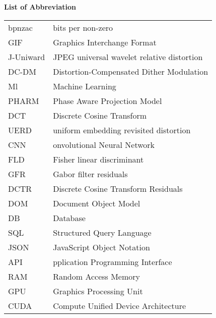 
\begin{flushleft}
     \Huge{\textbf{List of Abbreviation}}\vspace{1cm}\\
\end{flushleft}
\normalsize{\begin{tabular}{l l}
    bpnzac&bits per non-zero\\
    GIF&Graphics Interchange Format\\
    J-Uniward&JPEG universal wavelet relative distortion\\
    DC-DM&Distortion-Compensated Dither Modulation\\
Ml&Machine Learning\\
PHARM&Phase Aware Projection Model\\
DCT&Discrete Cosine Transform\\
UERD&uniform embedding revisited distortion\\ 
CNN&onvolutional Neural Network\\
FLD&Fisher linear discriminant\\
GFR&Gabor filter residuals\\
DCTR&Discrete Cosine Transform Residuals\\
DOM&Document Object Model\\
DB&Database\\
SQL&Structured Query Language\\
JSON&JavaScript Object Notation\\
API&pplication Programming Interface\\
RAM&Random Access Memory\\
GPU&Graphics Processing Unit\\
CUDA&Compute Unified Device Architecture\\
\end{tabular}}

